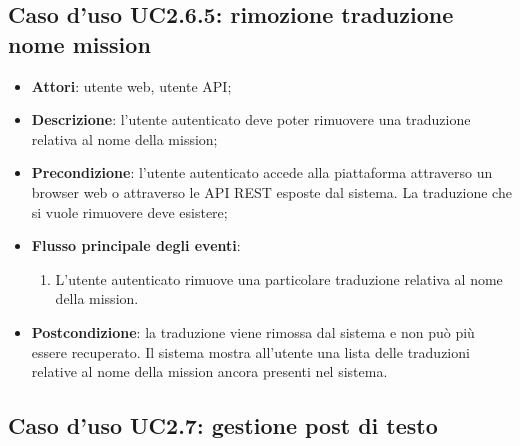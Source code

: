 \subsection{Caso d'uso UC2.6.5: rimozione traduzione nome mission}
\begin{itemize}
\item \textbf{Attori}: utente web, utente API;
\item \textbf{Descrizione}: l'utente autenticato deve poter rimuovere una traduzione relativa al nome della mission; 
      \item \textbf{Precondizione}: l'utente autenticato accede alla piattaforma attraverso un browser web o attraverso le API REST esposte dal sistema. La traduzione che si vuole rimuovere deve esistere;

        \item \textbf{Flusso principale degli eventi}:
          \begin{enumerate}
          \item L'utente autenticato rimuove una particolare traduzione relativa al nome della mission.

      \end{enumerate}
    \item \textbf{Postcondizione}: la traduzione viene rimossa dal sistema e non può più essere recuperato. Il sistema mostra all'utente una lista delle traduzioni relative al nome della mission ancora presenti nel sistema.
  \end{itemize}
\hypertarget{UC2.7}{}
\subsection{Caso d'uso UC2.7: gestione post di testo}

